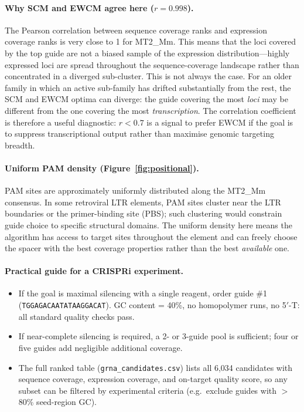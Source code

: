 \documentclass[11pt]{article}
\begin{document}
\paragraph{Why SCM and EWCM agree here ($r = 0.998$).}
The Pearson correlation between sequence coverage ranks and expression coverage ranks is
very close to 1 for MT2\_Mm.  This means that the loci covered by the top guide are not
a biased sample of the expression distribution---highly expressed loci are spread throughout
the sequence-coverage landscape rather than concentrated in a diverged sub-cluster.  This
is not always the case.  For an older family in which an active sub-family has drifted
substantially from the rest, the SCM and EWCM optima can diverge: the guide covering the
most \emph{loci} may be different from the one covering the most \emph{transcription}.
The correlation coefficient is therefore a useful diagnostic: $r < 0.7$ is a signal to
prefer EWCM if the goal is to suppress transcriptional output rather than maximise
genomic targeting breadth.

\paragraph{Uniform PAM density (Figure~\ref{fig:positional}).}
PAM sites are approximately uniformly distributed along the MT2\_Mm consensus.  In some
retroviral LTR elements, PAM sites cluster near the LTR boundaries or the primer-binding
site (PBS); such clustering would constrain guide choice to specific structural domains.
The uniform density here means the algorithm has access to target sites throughout the
element and can freely choose the spacer with the best coverage properties rather than
the best \emph{available} one.

\paragraph{Practical guide for a CRISPRi experiment.}
\begin{itemize}
  \item If the goal is maximal silencing with a single reagent, order guide \#1
    (\texttt{TGGAGACAATATAAGGACAT}).  GC content = 40\%, no homopolymer runs,
    no 5$'$-T: all standard quality checks pass.
  \item If near-complete silencing is required, a 2- or 3-guide pool is sufficient;
    four or five guides add negligible additional coverage.
  \item The full ranked table (\texttt{grna\_candidates.csv}) lists all 6,034 candidates
    with sequence coverage, expression coverage, and on-target quality score, so any
    subset can be filtered by experimental criteria (e.g.\ exclude guides with $>$80\%
    seed-region GC).
\end{itemize}
\end{document}
